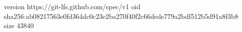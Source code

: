 version https://git-lfs.github.com/spec/v1
oid sha256:ab08217563e0fd364dc0c23e2ba270f40f2c66dede779a2bdf512b5d91a8f3b8
size 43840
